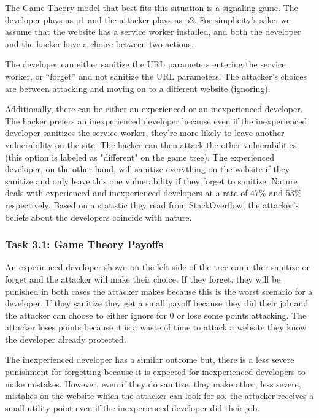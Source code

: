 \documentclass[letterpaper,12pt]{report}
\newcounter{taskset}
\newcounter{action}[taskset]
\begin{document}
The Game Theory model that best fits this situation is a signaling game. The developer plays as p1 and the attacker plays as p2. For simplicity’s sake, we assume that the website has a service worker installed, and both the developer and the hacker have a choice between two actions.

The developer can either sanitize the URL parameters entering the service worker, or ``forget” and not sanitize the URL parameters. The attacker’s choices are between attacking and moving on to a different website (ignoring).

Additionally, there can be either an experienced or an inexperienced developer. The hacker prefers an inexperienced developer because even if the inexperienced developer sanitizes the service worker, they're more likely to leave another vulnerability on the site. The hacker can then attack the other vulnerabilities (this option is labeled as "different" on the game tree). The experienced developer, on the other hand, will sanitize everything on the website if they sanitize and only leave this one vulnerability if they forget to sanitize. Nature deals with experienced and inexperienced developers at a rate of 47\% and 53\% respectively. Based on a statistic they read from StackOverflow, the attacker’s beliefs about the developers coincide with nature.

\subsubsection*{Task 3.1: Game Theory Payoffs}

An experienced developer shown on the left side of the tree can either sanitize or forget and the attacker will make their choice. If they forget, they will be punished in both cases the attacker makes because this is the worst scenario for a developer. If they sanitize they get a small payoff because they did their job and the attacker can choose to either ignore for 0 or lose some points attacking. The attacker loses points because it is a waste of time to attack a website they know the developer already protected.

The inexperienced developer has a similar outcome but, there is a less severe punishment for forgetting because it is expected for inexperienced developers to make mistakes. However, even if they do sanitize, they make other, less severe, mistakes on the website which the attacker can look for so, the attacker receives a small utility point even if the inexperienced developer did their job.
\end{document}
